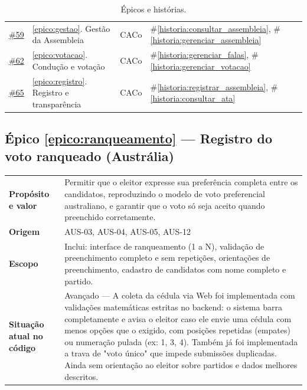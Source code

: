 \documentclass[12pt,a4paper]{article}
\newcounter{epico}
\newcounter{historia}
\begin{document}
\begin{table}[H]
\begin{tabular}{|c|p{7cm}|c|p{4.5cm}|}
    \href{https://github.com/GiizAzul/MC656/issues/59}{\#59} & \ref{epico:gestao}. Gestão da Assembleia & CACo & \#\ref{historia:consultar_assembleia}, \#\ref{historia:gerenciar_assembleia}\\
    
    \href{https://github.com/GiizAzul/MC656/issues/62}{\#62} & \ref{epico:votacao}. Condução e votação & CACo & \#\ref{historia:gerenciar_falas}, \#\ref{historia:gerenciar_votacao}\\
    
    \href{https://github.com/GiizAzul/MC656/issues/65}{\#65} & \ref{epico:registro}. Registro e transparência & CACo & \#\ref{historia:registrar_assembleia}, \#\ref{historia:consultar_ata}\\
    
    \hline
    \end{tabular}
    \caption{Épicos e histórias.}
\end{table}

\label{epico:ranqueamento}
\subsection*{Épico \ref{epico:ranqueamento} --- Registro do voto ranqueado (Austrália)}

\renewcommand{\arraystretch}{1.5}
\begin{table}[H]
    \centering
    \begin{tabular}{|m{4.5cm} | m{11cm}|}
    \hline
    
    \textbf{Propósito e valor} &
    Permitir que o eleitor expresse sua preferência completa entre os candidatos, reproduzindo o modelo de voto preferencial australiano, e garantir que o voto só seja aceito quando preenchido corretamente. \\
    
    \textbf{Origem} &
    AUS-03, AUS-04, AUS-05, AUS-12 \\
    
    \textbf{Escopo} &
    Inclui: interface de ranqueamento (1 a N), validação de preenchimento completo e sem repetições, orientações de preenchimento, cadastro de candidatos com nome completo e partido. \\
    
    
    \textbf{Situação atual no código} &
    Avançado --- A coleta da cédula via Web foi implementada com validações matemáticas estritas no backend: o sistema barra completamente e avisa o eleitor caso ele envie uma cédula com menos opções que o exigido, com posições repetidas (empates) ou numeração pulada (ex: 1, 3, 4). Também já foi implementada a trava de "voto único" que impede submissões duplicadas. Ainda sem orientação ao eleitor sobre partidos e dados melhores descritos. \\    
    \hline
    \end{tabular}
\end{table}
\end{document}
